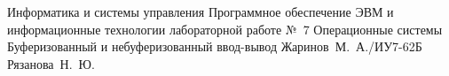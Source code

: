 \documentclass[a4paper,oneside,14pt]{extarticle}
\begin{document}
\makereporttitle
{Информатика и системы управления} %
{Программное обеспечение ЭВМ и информационные технологии} %
{лабораторной работе №~7} %
{Операционные системы} %
{Буферизованный и небуферизованный ввод-вывод} %
{} %
{Жаринов~М.~А./ИУ7-62Б} %
{Рязанова~Н.~Ю.} %

\setcounter{page}{2}

% 
% 


% 
% 
\end{document}
